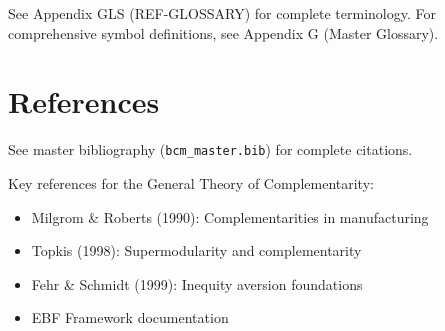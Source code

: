 See Appendix GLS (REF-GLOSSARY) for complete terminology.
For comprehensive symbol definitions, see Appendix G (Master Glossary).


\section{References}
\label{sec:gtc-references}

\nocite{bcm_master}
See master bibliography (\texttt{bcm\_master.bib}) for complete citations.

Key references for the General Theory of Complementarity:
\begin{itemize}[nosep]
    \item Milgrom \& Roberts (1990): Complementarities in manufacturing
    \item Topkis (1998): Supermodularity and complementarity
    \item Fehr \& Schmidt (1999): Inequity aversion foundations
    \item EBF Framework documentation
\end{itemize}



